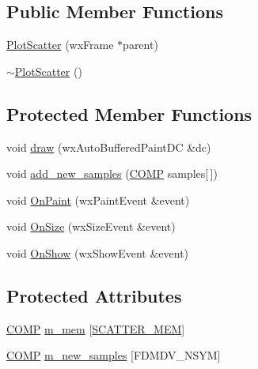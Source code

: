 \subsection*{Public Member Functions}
\begin{DoxyCompactItemize}
\item 
\hyperlink{class_plot_scatter_a3afb429623d26da2e130a53940afae3d}{Plot\-Scatter} (wx\-Frame $\ast$parent)
\item 
\hyperlink{class_plot_scatter_af6116b28aacb151a24435576b4cc0cf6}{$\sim$\-Plot\-Scatter} ()
\end{DoxyCompactItemize}
\subsection*{Protected Member Functions}
\begin{DoxyCompactItemize}
\item 
void \hyperlink{class_plot_scatter_aee86ff1a62c9f5131a9e2901078143d6}{draw} (wx\-Auto\-Buffered\-Paint\-D\-C \&dc)
\item 
void \hyperlink{class_plot_scatter_ab88a05eba2000d796fd5d9ce3a722923}{add\-\_\-new\-\_\-samples} (\hyperlink{struct_c_o_m_p}{C\-O\-M\-P} samples\mbox{[}$\,$\mbox{]})
\item 
void \hyperlink{class_plot_scatter_a96f16b57f595b0916a7fa4843aeed53f}{On\-Paint} (wx\-Paint\-Event \&event)
\item 
void \hyperlink{class_plot_scatter_aefccecfa048d8102724295fce801cb4e}{On\-Size} (wx\-Size\-Event \&event)
\item 
void \hyperlink{class_plot_scatter_a7f56259f17e46eea4b223f6e6b4c2a8d}{On\-Show} (wx\-Show\-Event \&event)
\end{DoxyCompactItemize}
\subsection*{Protected Attributes}
\begin{DoxyCompactItemize}
\item 
\hyperlink{struct_c_o_m_p}{C\-O\-M\-P} \hyperlink{class_plot_scatter_ab0c0683c27bb137bc7bb04aff7de88ab}{m\-\_\-mem} \mbox{[}\hyperlink{fdmdv2__defines_8h_a7bd435902b097e36f8ee04bd992a0000}{S\-C\-A\-T\-T\-E\-R\-\_\-\-M\-E\-M}\mbox{]}
\item 
\hyperlink{struct_c_o_m_p}{C\-O\-M\-P} \hyperlink{class_plot_scatter_a54ec91bd3e57b7648b1ee225de414993}{m\-\_\-new\-\_\-samples} \mbox{[}F\-D\-M\-D\-V\-\_\-\-N\-S\-Y\-M\mbox{]}
\end{DoxyCompactItemize}
